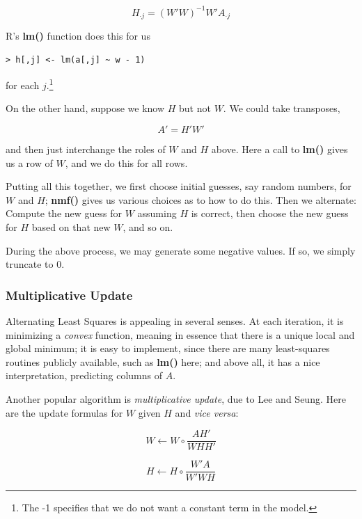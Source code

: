 \begin{equation}
H_{\cdot j} = (W'W)^{-1} W' A_{\cdot j}
\end{equation}

R's {\bf lm()} function does this for us

\begin{lstlisting}
> h[,j] <- lm(a[,j] ~ w - 1)
\end{lstlisting}

for each $j$.\footnote{The -1 specifies that we do not want a constant term in
the model.}

On the other hand, suppose we know $H$ but not $W$.  We could take 
transposes,

\begin{equation}
A' = H' W'
\end{equation}

and then just interchange the roles of $W$ and $H$ above.  Here a call
to {\bf lm()} gives us a row of $W$, and we do this for all rows.

Putting all this together, we first choose initial guesses, say random
numbers, for $W$ and $H$; {\bf nmf()} gives us various choices as to how
to do this.  Then we alternate: Compute the new guess for $W$ assuming
$H$ is correct, then choose the new guess for $H$ based on that new $W$,
and so on.

During the above process, we may generate some negative values.  If so,
we simply truncate to 0.

\subsubsection{Multiplicative Update}

Alternating Least Squares is appealing in several senses.  At each
iteration, it is minimizing a {\it convex} function, meaning in essence
that there is a unique local and global minimum; it is easy to
implement, since there are many least-squares routines publicly
available, such as {\bf lm()} here; and above all, it has a nice
interpretation, predicting columns of $A$.

Another popular algorithm is {\it multiplicative update}, due to Lee and
Seung.  Here are the update formulas for $W$ given $H$ and {\it vice
versa}:

\begin{equation}
W \leftarrow W \circ 
\frac
{AH'}
{WHH'}
\end{equation}

\begin{equation}
H \leftarrow H \circ 
\frac
{W'A}
{W'WH}
\end{equation}

